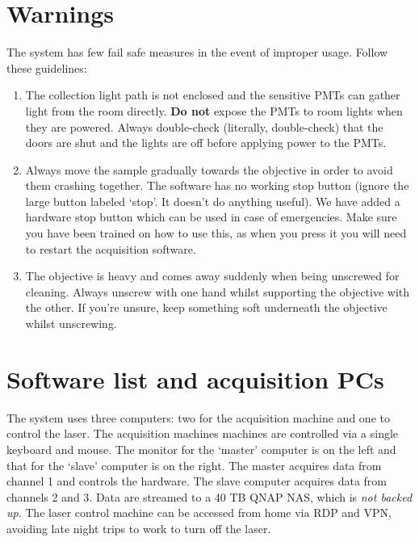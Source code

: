 \documentclass[paper=a4, fontsize=11pt]{scrartcl} %
\numberwithin{equation}{section} %
\numberwithin{figure}{section} %
\numberwithin{table}{section} %
\begin{document}
\section{Warnings}
The system has few fail safe measures in the event of improper usage.
Follow these guidelines:
\begin{enumerate}
\item The collection light path is not enclosed and the sensitive PMTs can gather light from the room directly.
\textbf{Do not} expose the PMTs to room lights when they are powered. 
Always double-check (literally, double-check) that the doors are shut and the lights are off before applying power to the PMTs. 
\item Always move the sample gradually towards the objective in order to avoid them crashing together. 
The software has no working stop button (ignore the large button labeled `stop'. It doesn't do anything useful). 
We have added a hardware stop button which can be used in case of emergencies. 
Make sure you have been trained on how to use this, as when you press it you will need to restart the acquisition software. 
\item The objective is heavy and comes away suddenly when being unscrewed for cleaning. 
Always unscrew with one hand whilst supporting the objective with the other. 
If you're unsure, keep something soft underneath the objective whilst unscrewing.
\end{enumerate}


\section{Software list and acquisition PCs}
The system uses three computers: two for the acquisition machine and one to control the laser.
The acquisition machines machines are controlled via a single keyboard and mouse. 
The monitor for the `master' computer is on the left and that for the `slave' computer is on the right. 
The master acquires data from channel 1 and controls the hardware. 
The slave computer acquires data from channels 2 and 3. 
Data are streamed to a 40 TB QNAP NAS, which is \textit{not backed up}.
The laser control machine can be accessed from home via RDP and VPN, avoiding late night trips to work to turn off the laser.
\end{document}
